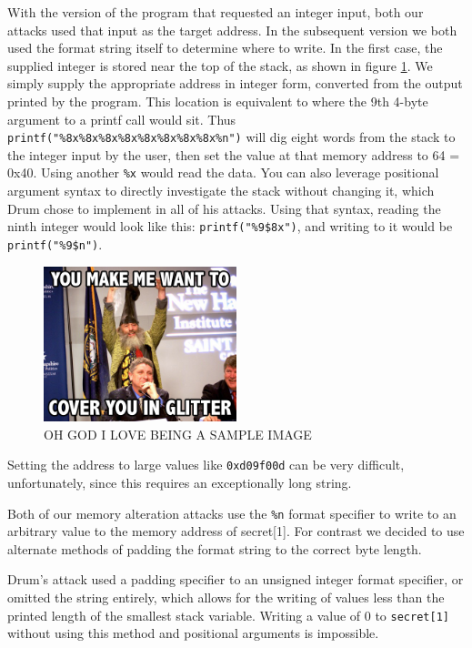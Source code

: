 With the version of the program that requested an integer input, both our attacks used that input as the target address. 
In the subsequent version we both used the format string itself to determine where to write. In the first
case, the supplied integer is stored near the top of the stack, as shown in figure \ref{fig_vul_prog_stack}. We simply
supply the appropriate address in integer form, converted from the output printed by the program. This location is
equivalent to where the 9th 4-byte argument to a printf call would sit. Thus {\tt
printf("\%8x\%8x\%8x\%8x\%8x\%8x\%8x\%8x\%n")} will dig eight words from the stack to the integer input by the user,
then set the value at that memory address to 64 = 0x40. Using another {\tt\%x} would read the data. You can also
leverage positional argument syntax to directly investigate the stack without changing it, which Drum chose to implement
in all of his attacks. Using that syntax, reading the ninth integer would look like this: {\tt printf("\%9\$8x")}, and
writing to it would be {\tt printf("\%9\$n")}.

\begin{figure}[ht]
	\centering
	\includegraphics[width = 0.5\textwidth]{./images/placeholder.jpg}
	\caption{OH GOD I LOVE BEING A SAMPLE IMAGE}
	\label{fig_vul_prog_stack}
\end{figure}

Setting the address to large values like {\tt 0xd09f00d} can be very difficult, unfortunately, since this requires an
exceptionally long string.

Both of our memory alteration attacks use the {\tt \%n} format specifier to write to an arbitrary value to the memory
address of secret[1]. For contrast we decided to use alternate methods of padding the format string to the correct byte
length.

Drum's attack used a padding specifier to an unsigned integer format specifier, or omitted the string entirely,
which allows for the writing of values less than the printed length of the smallest stack variable. Writing a value of
0 to {\tt secret[1]} without using this method and positional arguments is impossible.

